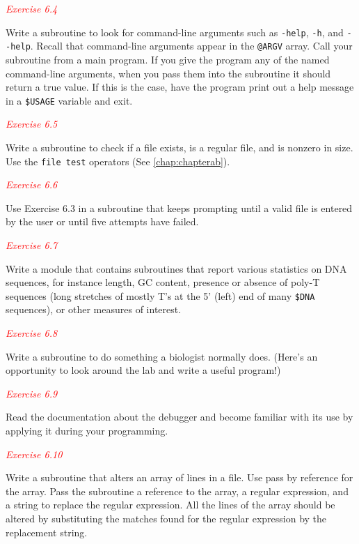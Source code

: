 \textcolor{red}{\textit{Exercise 6.4}}
\begin{adjustwidth}{1cm}{}
Write a subroutine to look for command-line arguments such as \verb|-help|, \verb|-h|, and \verb|--help|. Recall that command-line arguments appear in the \verb|@ARGV| array. Call your subroutine from a main program. If you give the program any of the named command-line arguments, when you pass them into the subroutine it should return a true value. If this is the case, have the program print out a help message in a \verb|$USAGE| variable and exit. 
\end{adjustwidth}

\textcolor{red}{\textit{Exercise 6.5}}
\begin{adjustwidth}{1cm}{}
Write a subroutine to check if a file exists, is a regular file, and is nonzero in size. Use the \verb|file test| operators (See \autoref{chap:chapterab}). 
\end{adjustwidth}

\textcolor{red}{\textit{Exercise 6.6}}
\begin{adjustwidth}{1cm}{}
Use Exercise 6.3 in a subroutine that keeps prompting until a valid file is entered by the user or until five attempts have failed. 
\end{adjustwidth}

\textcolor{red}{\textit{Exercise 6.7}}
\begin{adjustwidth}{1cm}{}
Write a module that contains subroutines that report various statistics on DNA sequences, for instance length, GC content, presence or absence of poly-T sequences (long stretches of mostly T's at the 5' (left) end of many \verb|$DNA| sequences), or other measures of interest. 
\end{adjustwidth}

\textcolor{red}{\textit{Exercise 6.8}}
\begin{adjustwidth}{1cm}{}
Write a subroutine to do something a biologist normally does. (Here's an opportunity to look around the lab and write a useful program!) 
\end{adjustwidth}

\textcolor{red}{\textit{Exercise 6.9}}
\begin{adjustwidth}{1cm}{}
Read the documentation about the debugger and become familiar with its use by applying it during your programming. 
\end{adjustwidth}

\textcolor{red}{\textit{Exercise 6.10}}
\begin{adjustwidth}{1cm}{}
Write a subroutine that alters an array of lines in a file. Use pass by reference for the array. Pass the subroutine a reference to the array, a regular expression, and a string to replace the regular expression. All the lines of the array should be altered by substituting the matches found for the regular expression by the replacement string.
\end{adjustwidth}
